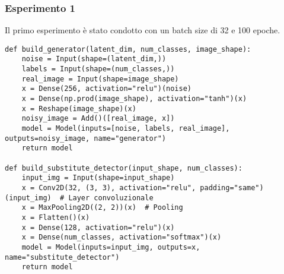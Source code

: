 \subsubsection{Esperimento 1}
Il primo esperimento è stato condotto con un batch size di 32 e 100 epoche.
\begin{lstlisting}[caption={Modello di GAN generato},captionpos=b]
def build_generator(latent_dim, num_classes, image_shape):
    noise = Input(shape=(latent_dim,))
    labels = Input(shape=(num_classes,))
    real_image = Input(shape=image_shape)
    x = Dense(256, activation="relu")(noise)
    x = Dense(np.prod(image_shape), activation="tanh")(x)
    x = Reshape(image_shape)(x)
    noisy_image = Add()([real_image, x])
    model = Model(inputs=[noise, labels, real_image], outputs=noisy_image, name="generator")
    return model

def build_substitute_detector(input_shape, num_classes):
    input_img = Input(shape=input_shape)
    x = Conv2D(32, (3, 3), activation="relu", padding="same")(input_img)  # Layer convoluzionale
    x = MaxPooling2D((2, 2))(x)  # Pooling
    x = Flatten()(x)
    x = Dense(128, activation="relu")(x)
    x = Dense(num_classes, activation="softmax")(x)
    model = Model(inputs=input_img, outputs=x, name="substitute_detector")
    return model
\end{lstlisting}

